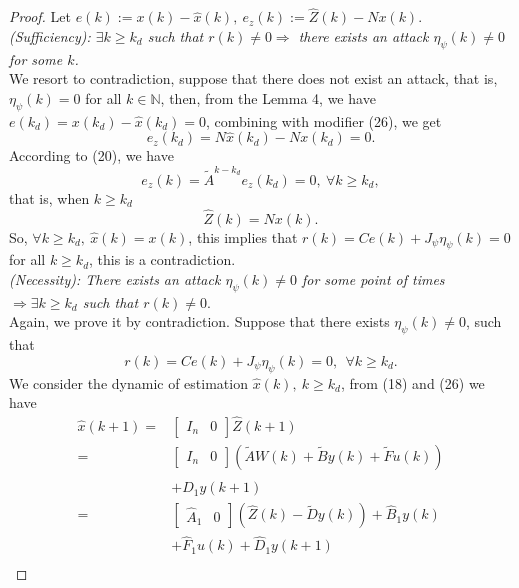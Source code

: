 \documentclass[english]{cccconf}
\theoremstyle{definition}
\begin{document}
\begin{proof}
Let $e(k):=x(k)-\hat{x}(k),\ e_z(k):=\hat{Z}(k)-Nx(k)$.\\
 \textit{(Sufficiency): $\exists k\geq k_d$ such that $r(k)\neq 0 \Rightarrow$ there exists an attack $\eta_\psi(k)\neq 0$ for some $k$.}\\
 We resort to contradiction, suppose that there does not exist an attack, that is, $\eta_\psi(k)=0$ for all $k\in\mathbb{N}$, then, from the Lemma 4, we have $e(k_d)=x(k_d)-\hat{x}(k_d)=0$, combining with modifier (26), we get
\begin{equation}
e_z(k_d)=N\hat{x}(k_d)-Nx(k_d)=0.
\end{equation}
According to (20), we have 
\begin{equation}
e_z(k)=\tilde{A}^{k-k_d}e_z(k_d)=0,\ \forall k\geq k_d,
\end{equation}
that is, when $ k\geq k_d$
\begin{equation}
\hat{Z}(k)=Nx(k).
\end{equation}
So, $\forall k\geq k_d,\ \hat{x}(k)=x(k)$, this implies that $r(k)=Ce(k)+J_{\psi}\eta_\psi(k)=0$ for all $k\geq k_d$, this is a contradiction.\\
\textit{(Necessity): There exists an attack $\eta_\psi(k)\neq 0$ for some point of times $\Rightarrow\exists k\geq k_d$ such that $r(k)\neq 0$}.\\
Again, we prove it by contradiction. Suppose that there exists $\eta_\psi(k)\neq 0$, such that
\begin{equation}
r(k)=Ce(k)+J_{\psi}\eta_\psi(k)=0,\ \ \forall k\geq k_d.
\end{equation}
 We consider the dynamic of estimation $\hat{x}(k),\ k\geq k_d$, from (18) and (26) we have
\begin{equation}\begin{split}
\hat{x}(k+1)=&\begin{bmatrix}
I_n&0
\end{bmatrix}\hat{Z}(k+1)\\
=&\begin{bmatrix}
I_n&0
\end{bmatrix}(\tilde{A}W(k)+\tilde{B}y(k)+\tilde{F}u(k))\\&+\hat{D}_1y(k+1)\\
=&\begin{bmatrix}
\hat{A}_1&0
\end{bmatrix}(\hat{Z}(k)-\tilde{D}y(k))+\hat{B}_1y(k)\\&+\hat{F}_1u(k)+\hat{D}_1y(k+1)\\

\end{split}
\end{equation}
\end{proof}
\end{document}
